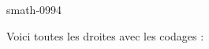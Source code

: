 
\begin{corrige}{smath-0994}

Voici toutes les droites avec les codages :
\begin{center}
   
\end{center}

\end{corrige}
